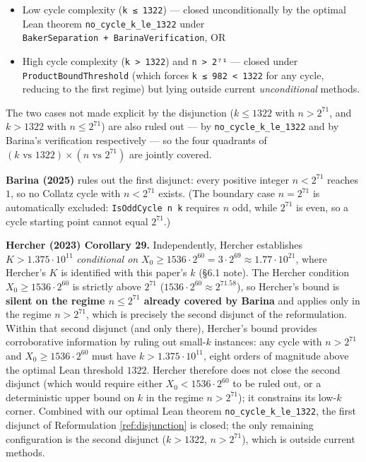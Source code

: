 \documentclass[
  11pt]{amsart}
\providecommand{\tightlist}{%
  \setlength{\itemsep}{0pt}\setlength{\parskip}{0pt}}
\theoremstyle{plain}
\theoremstyle{definition}
\theoremstyle{remark}
\begin{document}
\begin{itemize}
\tightlist
\item
  Low cycle complexity (\texttt{k\ ≤\ 1322}) --- closed unconditionally
  by the optimal Lean theorem \texttt{no\_cycle\_k\_le\_1322} under
  \texttt{BakerSeparation\ +\ BarinaVerification}, OR
\item
  High cycle complexity (\texttt{k\ \textgreater{}\ 1322}) and
  \texttt{n\ \textgreater{}\ 2⁷¹} --- closed under
  \texttt{ProductBoundThreshold} (which forces
  \texttt{k\ ≤\ 982\ \textless{}\ 1322} for any cycle, reducing to the
  first regime) but lying outside current \emph{unconditional} methods.
\end{itemize}

The two cases not made explicit by the disjunction (\(k \leq 1322\) with
\(n > 2^{71}\), and \(k > 1322\) with \(n \leq 2^{71}\)) are also ruled
out --- by \texttt{no\_cycle\_k\_le\_1322} and by Barina's verification
respectively --- so the four quadrants of
\((k \text{ vs } 1322) \times (n \text{ vs } 2^{71})\) are jointly
covered.

\textbf{Barina (2025)} rules out the first disjunct: every positive
integer \(n < 2^{71}\) reaches \(1\), so no Collatz cycle with
\(n < 2^{71}\) exists. (The boundary case \(n = 2^{71}\) is
automatically excluded: \texttt{IsOddCycle\ n\ k} requires \(n\) odd,
while \(2^{71}\) is even, so a cycle starting point cannot equal
\(2^{71}\).)

\textbf{Hercher (2023) Corollary 29.} Independently, Hercher establishes
\(K > 1.375 \cdot 10^{11}\) \emph{conditional on}
\(X_0 \geq 1536 \cdot 2^{60} = 3 \cdot 2^{69} \approx 1.77 \cdot 10^{21}\),
where Hercher's \(K\) is identified with this paper's \(k\) (§6.1 note).
The Hercher condition \(X_0 \geq 1536 \cdot 2^{60}\) is strictly above
\(2^{71}\) (\(1536 \cdot 2^{60} \approx 2^{71.58}\)), so Hercher's bound
is \textbf{silent on the regime \(n \leq 2^{71}\) already covered by
Barina} and applies only in the regime \(n > 2^{71}\), which is
precisely the second disjunct of the reformulation. Within that second
disjunct (and only there), Hercher's bound provides corroborative
information by ruling out small-\(k\) instances: any cycle with
\(n > 2^{71}\) and \(X_0 \geq 1536 \cdot 2^{60}\) must have
\(k > 1.375 \cdot 10^{11}\), eight orders of magnitude above the optimal
Lean threshold \(1322\). Hercher therefore does not close the second
disjunct (which would require either \(X_0 < 1536 \cdot 2^{60}\) to be
ruled out, or a deterministic upper bound on \(k\) in the regime
\(n > 2^{71}\)); it constrains its low-\(k\) corner. Combined with our
optimal Lean theorem \texttt{no\_cycle\_k\_le\_1322}, the first disjunct
of Reformulation \ref{ref:disjunction} is closed; the only remaining
configuration is the second disjunct (\(k > 1322\), \(n > 2^{71}\)),
which is outside current methods.
\end{document}
